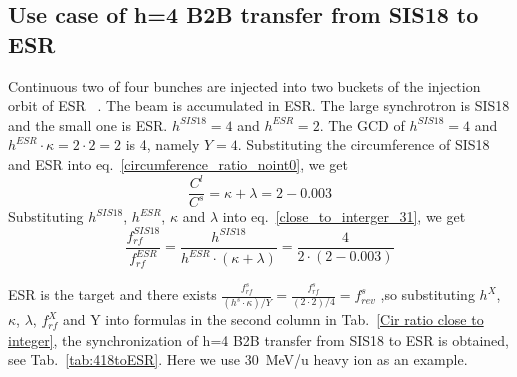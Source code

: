 \subsection{Use case of h=4 B2B transfer from SIS18 to ESR} 
Continuous two of four bunches are injected into two buckets of the injection orbit of ESR ~\cite{steck_demonstration_2011}. The beam is accumulated in ESR. The large synchrotron is SIS18 and the small one is ESR. $h^{\mathit{SIS18}}=4$ and $h^{\mathit{ESR}}=2$. The GCD of $h^{\mathit{SIS18}}=4$ and $h^{\mathit{ESR}}\cdot \kappa=2\cdot 2=2$ is 4, namely $Y=4$. Substituting the circumference of SIS18 and ESR into eq.~\ref{circumference_ratio_noint0}, we get
\begin{equation}
\frac{C^l}{C^s}=\kappa + \lambda =2-0.003
\end{equation}
Substituting $h^{\mathit{SIS18}}$, $h^{\mathit{ESR}}$, $\kappa$ and $\lambda$ into eq.~\ref{close_to_interger_31}, we get
\begin{equation}
\frac {f_{\mathit{rf}}^{\mathit{SIS18}}}{f_{\mathit{rf}}^{\mathit{ESR}}}= \frac{h^{\mathit{SIS18}}}{h^{\mathit{ESR}} \cdot (\kappa+ \lambda)}=\frac {4}{2 \cdot(2-0.003)}
\end{equation}

ESR is the target and there exists $\frac{f_{\mathit{rf}}^{s}}{(h^s \cdot\kappa)/Y}=\frac{f_{\mathit{rf}}^{s}}{(2 \cdot2)/4}=f_{\mathit{rev}}^{s}$ ,so substituting $h^X$, $\kappa$, $\lambda$, $f_{\mathit{rf}}^{X}$ and Y into formulas in the second column in Tab.~\ref{Cir ratio close to integer}, the synchronization of h=4 B2B transfer from SIS18 to ESR is obtained, see Tab.~\ref{tab:418toESR}. Here we use \SI{30}{MeV/\atomicmassunit} heavy ion as an example. 


